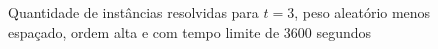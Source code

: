 \begin{figure}%
    \centering
    \caption{Quantidade de instâncias resolvidas para $t = 3$, peso
      aleatório menos espaçado, ordem alta e com tempo limite de
      3600 segundos}%
    \label{fig:tree_sf3_s40_50_small_random_high_time}%
\end{figure}

